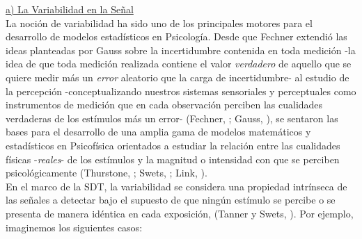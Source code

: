 
\underline{a) La Variabilidad en la Señal}\\

La noción de variabilidad ha sido uno de los principales motores para el desarrollo de modelos estadísticos en Psicología. Desde que Fechner extendió las ideas planteadas por Gauss sobre la incertidumbre contenida en toda medición -la idea de que toda medición realizada contiene el valor \textit{verdadero} de aquello que se quiere medir más un \textit{error} aleatorio que la carga de incertidumbre- al estudio de la percepción -conceptualizando nuestros sistemas sensoriales y perceptuales como instrumentos de medición que en cada observación perciben las cualidades verdaderas de los estímulos más un error- (Fechner, \citeyear{Fechner}; Gauss, \citeyear{Gauss}), se sentaron las bases para el desarrollo de una amplia gama de modelos matemáticos y estadísticos en Psicofísica orientados a estudiar la relación entre las cualidades físicas -\textit{reales}- de los estímulos y la magnitud o intensidad con que se perciben psicológicamente (Thurstone, \citeyear{Thurstone1927}; Swets, \citeyear{Swets1973}; Link, \citeyear{Link1994}).\\

En el marco de la SDT, la variabilidad se considera una propiedad intrínseca de las señales a detectar bajo el supuesto de que ningún estímulo se percibe o se presenta de manera idéntica en cada exposición, (Tanner y Swets, \citeyear{Tanner1954}). Por ejemplo, imaginemos los siguientes casos: \\

